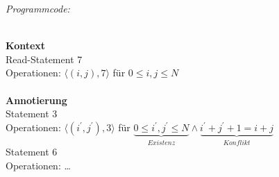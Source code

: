 \textit{Programmcode:}\\
    \begin{procedure}[H]
    \SetLine
    \end{procedure}

~\\[6cm]
\textbf{Kontext}\\
Read-Statement 7\\
Operationen: $\langle (i,j), 7 \rangle$ für $0 \leq i, j \leq N$\\
\\
\textbf{Annotierung}\\
Statement 3\\
Operationen: \(\langle (i^\prime,j^\prime), 3 \rangle\) für \( \underbrace{0 \leq i^\prime, j^\prime \leq N}_{Existenz} \land \underbrace{i^\prime + j^\prime + 1 = i + j}_{Konflikt}\)\\
Statement 6\\
Operationen: \dots\\

